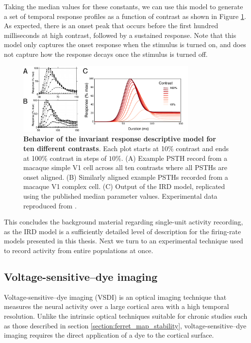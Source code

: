 \documentclass[phd,ianc,twoside]{infthesis}
\begin{document}
Taking the median values for these constants, we can use this model to
generate a set of temporal response profiles as a function of contrast
as shown in Figure \ref{fig:IRDModel}. As expected, there is an onset
peak that occurs before the first hundred milliseconds at high contrast,
followed by a sustained response. Note that this model only captures the
onset response when the stimulus is turned on, and does not capture how
the response decays once the stimulus is turned off.

\begin{figure}
\center
\includegraphics[width=0.8\textwidth]{./figures/IRD_example.pdf}
\caption{{\bf Behavior of the invariant response descriptive model for
    ten different contrasts}. Each plot starts at 10\% contrast and ends
  at 100\% contrast in steps of $10\%$.  (A) Example PSTH record from a
  macaque simple V1 cell across all ten contrasts where all PSTHs are onset
  aligned. (B) Similarly aligned example PSTHs recorded from a macaque
  V1 complex cell. (C) Output of the IRD model, replicated using the
  published median parameter values. Experimental data reproduced from
  \citet{albrecht_jneurophys02}.}
\label{fig:IRDModel}
\end{figure}

This concludes the background material regarding single-unit activity
recording, as the IRD model is a sufficiently detailed level of
description for the firing-rate models presented in this thesis. Next we
turn to an experimental technique used to record activity from entire
populations at once.


\subsection{Voltage-sensitive--dye imaging} %
\label{section:VSDI_background}

Voltage-sensitive--dye imaging (VSDI) is an optical imaging technique
that measures the neural activity over a large cortical area with a high
temporal resolution. Unlike the intrinsic optical techniques suitable
for chronic studies such as those described in section
\ref{section:ferret_map_stability}, voltage-sensitive--dye imaging
requires the direct application of a dye to the cortical surface.
\end{document}
